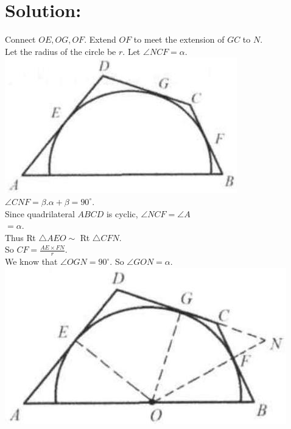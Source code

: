 \documentclass[10pt]{article}
\begin{document}
\section*{Solution:}
Connect \(O E, O G, O F\). Extend \(O F\) to meet the extension of \(G C\) to \(N\).\\
Let the radius of the circle be \(r\). Let \(\angle N C F=\alpha\).\\
\includegraphics[max width=\textwidth, center]{2025_04_17_97bc1f7e44d93c271a88g-149}\\
\(\angle C N F=\beta . \alpha+\beta=90^{\circ}\).\\
Since quadrilateral \(A B C D\) is cyclic, \(\angle N C F=\angle A\)\\
\(=\alpha\).\\
Thus Rt \(\triangle A E O \sim\) Rt \(\triangle C F N\).\\
So \(C F=\frac{A E \times F N}{r}\).\\
We know that \(\angle O G N=90^{\circ}\). So \(\angle G O N=\alpha\).\\
\includegraphics[max width=\textwidth, center]{2025_04_17_97bc1f7e44d93c271a88g-149(2)}
\end{document}
